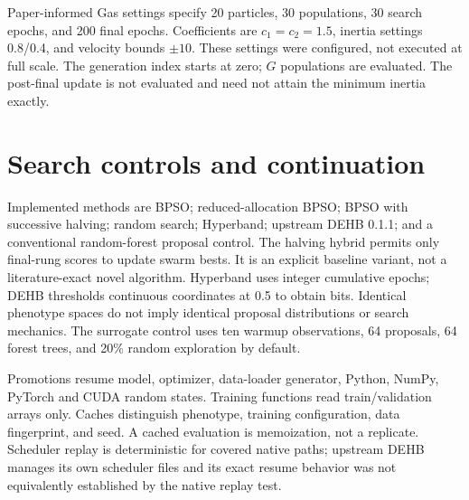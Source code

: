 \documentclass[11pt,a4paper]{report}
\begin{document}
\noindent{}

\vspace{3mm}
Paper-informed Gas settings specify 20 particles, 30 populations, 30 search epochs, and 200 final epochs. Coefficients are $c_1=c_2=1.5$, inertia settings 0.8/0.4, and velocity bounds $\pm10$. These settings were configured, not executed at full scale. The generation index starts at zero; $G$ populations are evaluated. The post-final update is not evaluated and need not attain the minimum inertia exactly.

\section{Search controls and continuation}
Implemented methods are BPSO; reduced-allocation BPSO; BPSO with successive halving; random search; Hyperband; upstream DEHB 0.1.1; and a conventional random-forest proposal control. The halving hybrid permits only final-rung scores to update swarm bests. It is an explicit baseline variant, not a literature-exact novel algorithm. Hyperband uses integer cumulative epochs; DEHB thresholds continuous coordinates at 0.5 to obtain bits. Identical phenotype spaces do not imply identical proposal distributions or search mechanics. The surrogate control uses ten warmup observations, 64 proposals, 64 forest trees, and 20\% random exploration by default.

Promotions resume model, optimizer, data-loader generator, Python, NumPy, PyTorch and CUDA random states. Training functions read train/validation arrays only. Caches distinguish phenotype, training configuration, data fingerprint, and seed. A cached evaluation is memoization, not a replicate. Scheduler replay is deterministic for covered native paths; upstream DEHB manages its own scheduler files and its exact resume behavior was not equivalently established by the native replay test.
\end{document}
